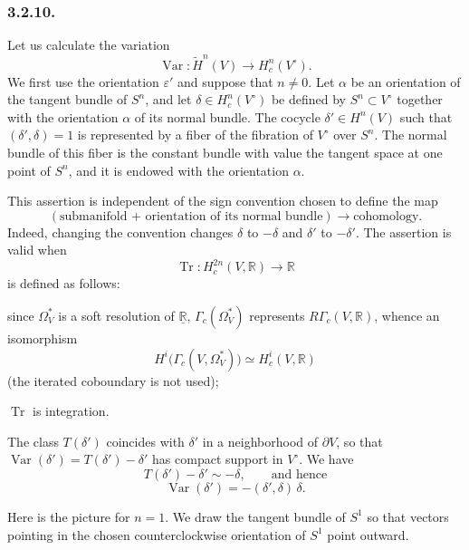\subsubsection*{3.2.10.}
Let us calculate the variation
\[
\operatorname{Var}:\widetilde H^n(V)
\longrightarrow H_c^n(V^\circ).
\]
We first use the orientation $\varepsilon'$ and suppose that $n\ne0$.
Let $\alpha$ be an orientation of the tangent bundle of $S^n$, and
let $\delta\in H_c^n(V^\circ)$ be defined by
$S^n\subset V^\circ$ together with the orientation $\alpha$ of its
normal bundle.  The cocycle $\delta'\in H^n(V)$ such that
$(\delta',\delta)=1$ is represented by a fiber of the fibration of
$V^\circ$ over $S^n$.  The normal bundle of this fiber is the constant
bundle with value the tangent space at one point of $S^n$, and it is
endowed with the orientation $\alpha$.

This assertion is independent of the sign convention chosen to define
the map
\[
(\text{submanifold + orientation of its normal bundle})
\longrightarrow\text{cohomology}.
\]
Indeed, changing the convention changes $\delta$ to $-\delta$ and
$\delta'$ to $-\delta'$.  The assertion is valid when
\[
\operatorname{Tr}:H_c^{2n}(V,\mathbb R)\longrightarrow\mathbb R
\]
is defined as follows:
\begin{description}[leftmargin=2.8em,labelsep=.5em]
\item[\textup{($\alpha$)}] since $\Omega_V^*$ is a soft resolution of $\underline{\mathbb R}$,
  $\Gamma_c(\Omega_V^*)$ represents $R\Gamma_c(V,\mathbb R)$, whence
  an isomorphism
  \[
  H^i\bigl(\Gamma_c(V,\Omega_V^*)\bigr)
  \simeq H_c^i(V,\mathbb R)
  \]
  (the iterated coboundary is not used);
\item[\textup{($\beta$)}] $\operatorname{Tr}$ is integration.
\end{description}

The class $T(\delta')$ coincides with $\delta'$ in a neighborhood of
$\partial V$, so that
\(
\operatorname{Var}(\delta')=T(\delta')-\delta'
\)
has compact support in $V^\circ$.  We have
\[
T(\delta')-\delta'\sim-\delta,
\qquad\text{and hence}
\]
\[
\operatorname{Var}(\delta')
=-(\delta',\delta)\,\delta.
\]

Here is the picture for $n=1$.  We draw the tangent bundle of $S^1$
so that vectors pointing in the chosen counterclockwise orientation of
$S^1$ point outward.

